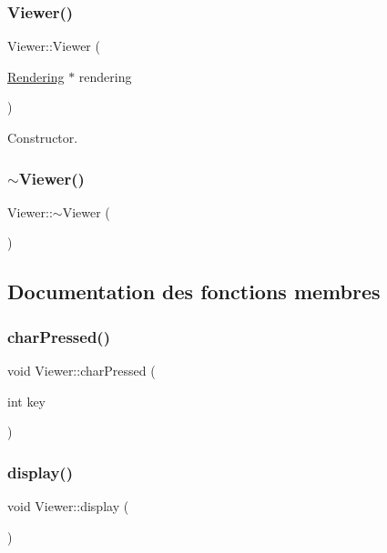 \subsubsection{\texorpdfstring{Viewer()}{Viewer()}}
{\footnotesize\ttfamily Viewer\+::\+Viewer (\begin{DoxyParamCaption}\item[{\hyperlink{class_rendering}{Rendering} $\ast$}]{rendering }\end{DoxyParamCaption})}



Constructor. 

\mbox{\label{class_viewer_a324e5a6a1532fe5eac3f3b0e4792b2da}} 
\subsubsection{\texorpdfstring{$\sim$\+Viewer()}{~Viewer()}}
{\footnotesize\ttfamily Viewer\+::$\sim$\+Viewer (\begin{DoxyParamCaption}{ }\end{DoxyParamCaption})\hspace{0.3cm}{\ttfamily [virtual]}}



\subsection{Documentation des fonctions membres}
\mbox{\label{class_viewer_a12155081915ec2fcf3554534b8aa52d6}} 
\subsubsection{\texorpdfstring{char\+Pressed()}{charPressed()}}
{\footnotesize\ttfamily void Viewer\+::char\+Pressed (\begin{DoxyParamCaption}\item[{int}]{key }\end{DoxyParamCaption})}

\mbox{\label{class_viewer_a277a934adb86150b09d044b7cee822f8}} 
\subsubsection{\texorpdfstring{display()}{display()}}
{\footnotesize\ttfamily void Viewer\+::display (\begin{DoxyParamCaption}{ }\end{DoxyParamCaption})}



